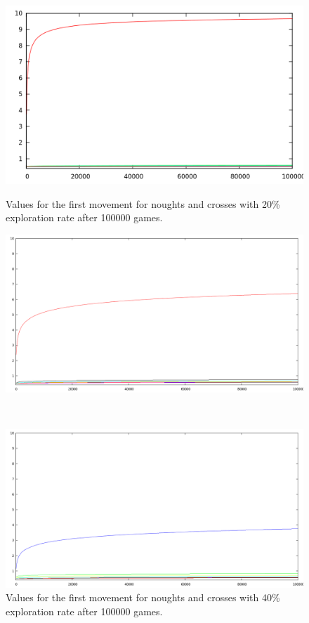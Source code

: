 \documentclass[12pt]{article}
\begin{document}
\begin{figure}[htbp!]
\centering
\begin{minipage}[t]{0.45\linewidth}
	\includegraphics[scale=0.25]{images/ttt_eps_0_2}
	\caption{Values for the first movement for noughts and crosses with 20\% exploration rate after 100000 games.}
	\label{fig:ttt_eps_0_2}
\end{minipage}
\quad
\begin{minipage}[t]{0.45\linewidth}
	\includegraphics[scale=0.23]{images/ttt_eps_0_4}
	\caption{Values for the first movement for noughts and crosses with 40\% exploration rate after 100000 games.}
	\label{fig:ttt_eps_0_4}
\end{minipage}
\\
\begin{minipage}[t]{0.5\linewidth}
	\includegraphics[scale=0.23]{images/ttt_eps_0_6}

\end{minipage}
\end{figure}
\end{document}
